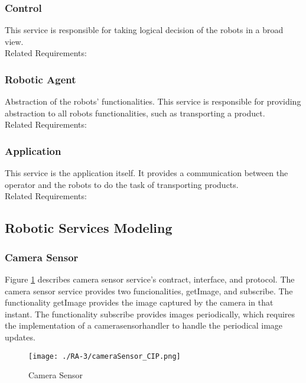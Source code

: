 \subsubsection*{Control}
This service is responsible for taking logical decision of the robots in a broad view.
\\Related Requirements:

\subsubsection*{Robotic Agent}
Abstraction of the robots' functionalities. This service is responsible for providing abstraction to all robots functionalities, such as transporting a product.%
\\Related Requirements:

\subsubsection*{Application}
This service is the application itself. It provides a communication between the operator and the robots to do the task of transporting products.
\\Related Requirements:

\subsection{Robotic Services Modeling}
\subsubsection{Camera Sensor} %
Figure \ref{fig:camerasensor_cip} describes camera sensor service's contract, interface, and protocol. The camera sensor service provides two funcionalities, getImage, and subscribe. The functionality getImage provides the image captured by the camera in that instant. The functionality subscribe provides images periodically, which requires the implementation of a camerasensorhandler to handle the periodical image updates.
\begin{figure}[ht!]
 \centering
 \texttt{[image: ./RA-3/cameraSensor\_CIP.png]}
 \caption{Camera Sensor}
 \label{fig:camerasensor_cip}
\end{figure}

